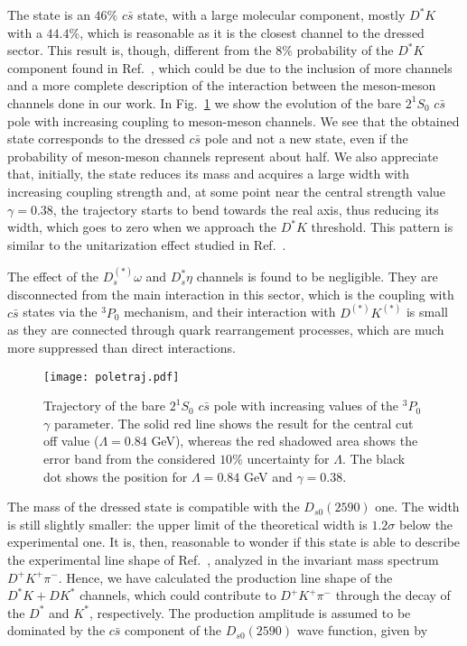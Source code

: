 \documentclass[aps, prd, floatfix, twocolumn, superscriptaddress, nofootinbib]{revtex4-1}
\begin{document}
The state is an $46\%$ $c\bar s$ state, with a large molecular component, mostly $D^*K$ with a $44.4\%$, which is reasonable as it is the closest channel to the dressed sector. This result is, though, different from the $8\%$ probability of the $D^*K$ component found in Ref.~\cite{Xie:2021dwe}, which could be due to the inclusion of more channels and a more complete description of the interaction between the meson-meson channels done in our work. In Fig.~\ref{fig:traj} we show the evolution of the bare $2^1S_0$ $c\bar s$ pole with increasing coupling to meson-meson channels. We see that the obtained state corresponds to the dressed $c\bar s$ pole and not a new state, even if the probability of meson-meson channels represent about half. We also appreciate that, initially, the state reduces its mass and acquires a large width with increasing coupling strength and, at some point near the central strength value $\gamma=0.38$, the trajectory starts to bend towards the real axis, thus reducing its width, which goes to zero when we approach the $D^*K$ threshold. This pattern is similar to the unitarization effect studied in Ref.~\cite{Hammer:2016prh}.

The effect of the $D_s^{(*)}\omega$ and $D_s^*\eta$ channels is found to be negligible. They are disconnected from the main interaction in this sector, which is the coupling with $c\bar s$ states via the $^3P_0$ mechanism, and their interaction with $D^{(*)}K^{(*)}$ is small as  they are connected through quark rearrangement processes, which are much more suppressed than direct interactions.

\begin{figure}[!t]
\centering
\texttt{[image: poletraj.pdf]}
%
\caption{\label{fig:traj} Trajectory of the bare $2^1S_0$ $c\bar s$ pole with increasing values of the $^3P_0$ $\gamma$ parameter. The solid red line shows the result for the central cut off value ($\Lambda=0.84$ GeV), whereas the red shadowed area shows the error band from the considered $10\%$ uncertainty for $\Lambda$. The black dot shows the position for $\Lambda=0.84$ GeV and $\gamma=0.38$.}
\end{figure}


The mass of the dressed state is compatible with the $D_{s0}(2590)$ one. The width is still slightly smaller: the upper limit of the theoretical width is $1.2\sigma$ below the experimental one. It is, then, reasonable to wonder if this state is able to describe the experimental line shape of Ref.~\cite{LHCb:2020gnv}, analyzed in the invariant mass spectrum $D^+K^+\pi^-$. Hence, we have calculated the production line shape of the $D^*K+DK^*$ channels, which could contribute to $D^+K^+\pi^-$ through the decay of the $D^*$ and $K^*$, respectively.
 The production amplitude is assumed to be dominated by the $c\bar s$ component of the $D_{s0}(2590)$ wave function,  given by~\cite{Baru:2010ww}
\end{document}
